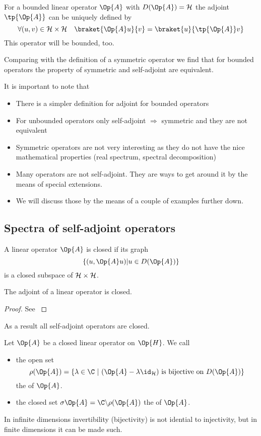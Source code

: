 \begin{rem}
	For a bounded linear operator $\Op{A}$ with $D(\Op{A}) = \hilbert$
	the adjoint $\tp{\Op{A}}$ can be uniquely defined by
	\[ \forall (u,v) \in \hilbert \times \hilbert \quad \braket{\Op{A} u}{v} = \braket{u}{\tp{\Op{A}} v} \]
	This operator will be bounded, too.

	Comparing with the definition of a symmetric operator we find that for
	bounded operators the property of symmetric and self-adjoint are equivalent.
\end{rem}

It is important to note that
\begin{itemize}
	\item There is a simpler definition for adjoint for bounded operators
	\item For unbounded operators only self-adjoint $\Rightarrow$ symmetric
		and they are not equivalent
	\item Symmetric operators are not very interesting
		as they do not have the nice mathematical properties (real spectrum, spectral decomposition)
	\item Many \QM operators are not self-adjoint.
		They are ways to get around it by the means of special extensions.
	\item We will discuss those by the means of a couple of examples
		further down.
\end{itemize}

\subsection{Spectra of self-adjoint operators}
\begin{defn}
	A linear operator $\Op{A}$ is closed if its graph
	\[ \{ (u, \Op{A}u) | u \in D(\Op{A}) \} \]
	is a closed subspace of $\mathcal{H} \times \mathcal{H}$.
\end{defn}

\begin{prop}
	The adjoint of a linear operator is closed.
	\begin{proof}
		See \cite[p. 17]{Helffer2013}
	\end{proof}
\end{prop}
As a result all self-adjoint operators are closed.

\newcommand{\shiftop}{(\Op{A} - \lambda \id_{\hilbert})}
\begin{defn}
	Let $\Op{A}$ be a closed linear operator on $\Op{H}$.
	We call
	\begin{itemize}
		\item the open set
			\[ \rho(\Op{A}) = \left\{ \lambda \in \C \ \middle| \
				\shiftop \
				\text{is bijective on $D(\Op{A})$} \right\} \]
			the  of $\Op{A}$.
		\item the closed set $\sigma{\Op{A}} = \C \backslash \rho(\Op{A})$
			the \newterm{spectrum} of $\Op{A}$.
	\end{itemize}
\end{defn}
In infinite dimensions invertibility (bijectivity) is not idential to injectivity,
but in finite dimensions it can be made such.

